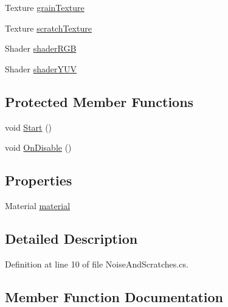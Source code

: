 \begin{DoxyCompactItemize}
Texture \mbox{\hyperlink{class_unity_standard_assets_1_1_image_effects_1_1_noise_and_scratches_a57e7ff7ee3c3f112b3ab778f2110d65c}{grain\+Texture}}
\item 
Texture \mbox{\hyperlink{class_unity_standard_assets_1_1_image_effects_1_1_noise_and_scratches_a28fca5bed058b6be6b511b985e6226a1}{scratch\+Texture}}
\item 
Shader \mbox{\hyperlink{class_unity_standard_assets_1_1_image_effects_1_1_noise_and_scratches_a2847c4c0daf2e94c5e755c7124857e43}{shader\+R\+GB}}
\item 
Shader \mbox{\hyperlink{class_unity_standard_assets_1_1_image_effects_1_1_noise_and_scratches_a536cef26e199da24153e887ba0bb7267}{shader\+Y\+UV}}
\end{DoxyCompactItemize}
\subsection*{Protected Member Functions}
\begin{DoxyCompactItemize}
\item 
void \mbox{\hyperlink{class_unity_standard_assets_1_1_image_effects_1_1_noise_and_scratches_a0bb80ca6e82b80b5fbf1b48575887fb7}{Start}} ()
\item 
void \mbox{\hyperlink{class_unity_standard_assets_1_1_image_effects_1_1_noise_and_scratches_aa5d3399f11b0cf5298ce95c99764ecfb}{On\+Disable}} ()
\end{DoxyCompactItemize}
\subsection*{Properties}
\begin{DoxyCompactItemize}
\item 
Material \mbox{\hyperlink{class_unity_standard_assets_1_1_image_effects_1_1_noise_and_scratches_a51339988feb1692a15c5e03f57ff0f48}{material}}
\end{DoxyCompactItemize}


\subsection{Detailed Description}


Definition at line 10 of file Noise\+And\+Scratches.\+cs.



\subsection{Member Function Documentation}
\mbox{\label{class_unity_standard_assets_1_1_image_effects_1_1_noise_and_scratches_aa5d3399f11b0cf5298ce95c99764ecfb}} 
